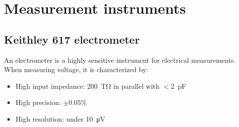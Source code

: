 \section{Measurement instruments}
\subsection{Keithley 617 electrometer}
An electrometer is a highly sensitive instrument for electrical measurements.
When measuring voltage, it is characterized by:
\begin{itemize}
    \item High input impedance:
\SI{200}{\tera\ohm} in parallel with $<$\SI{2}{\pico\farad}
\item High precision: $\pm0.05\%$
\item High resolution: under \SI{10}{\micro\volt}
\end{itemize}
